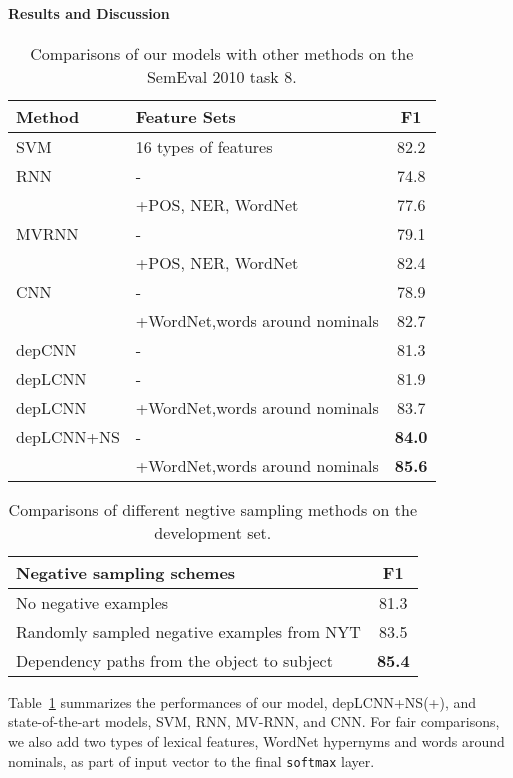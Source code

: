 \documentclass[11pt,a4paper]{article}
\begin{document}
\paragraph{Results and Discussion}
\begin{table}
\small
\centering
\begin{tabular}{l|l|c}
\hline
Method & Feature Sets & F1 \\
\hline
\hline
SVM & 16 types of features & 82.2 \\
\hline
RNN & - & 74.8 \\
& +POS, NER, WordNet & 77.6 \\
\hline
MVRNN & - & 79.1 \\
 & +POS, NER, WordNet & 82.4 \\
\hline
CNN & - & 78.9 \\
{\tiny \cite{zeng-EtAl:2014:Coling}}& +WordNet,words around nominals & 82.7 \\\hline
depCNN & - & 81.3\\
depLCNN & - & 81.9\\
depLCNN & +WordNet,words around nominals & 83.7 \\
depLCNN+NS & - & \textbf{84.0} \\
& +WordNet,words around nominals & \textbf{85.6} \\
\hline
\end{tabular}
\caption{Comparisons of our models with other methods on the SemEval 2010 task 8.}
\label{tab:results}
\end{table}

\begin{table}
\small
\centering
\begin{tabular}{l|c}
\hline
Negative sampling schemes & F1 \\
\hline
No negative examples & 81.3\\
\hline
Randomly sampled negative examples from NYT &  83.5\\
\hline
Dependency paths from the object to subject &  \textbf{85.4}\\
\hline
\end{tabular}
\caption{Comparisons of different negtive sampling methods on the development set.}
\label{tab:results_2}
\end{table}

Table~\ref{tab:results} summarizes  
 the performances of our model, depLCNN+NS(+), and state-of-the-art models, SVM\cite{hendrickx}, 
RNN, MV-RNN\cite{DBLP:conf/emnlp/SocherHMN12}, and CNN\cite{zeng-EtAl:2014:Coling}.
For fair comparisons, we also add two types of lexical features,  
WordNet hypernyms and words around nominals, as part of input vector to the final \texttt{softmax} layer.
\end{document}
